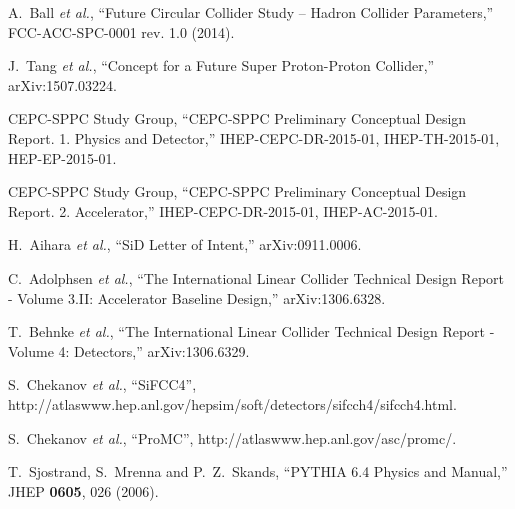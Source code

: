\documentclass{PoS}
\begin{document}
\begin{thebibliography}{99}
 A.~Ball {\it et al.}, 
``Future Circular Collider Study -- Hadron Collider Parameters,'' 
 FCC-ACC-SPC-0001 rev. 1.0 (2014).

  J.~Tang {\it et al.},
  ``Concept for a Future Super Proton-Proton Collider,''
  arXiv:1507.03224.%

  CEPC-SPPC Study Group,
  ``CEPC-SPPC Preliminary Conceptual Design Report. 1. Physics and Detector,''
  IHEP-CEPC-DR-2015-01, IHEP-TH-2015-01, HEP-EP-2015-01.


  CEPC-SPPC Study Group,
  ``CEPC-SPPC Preliminary Conceptual Design Report. 2.  Accelerator,''
  IHEP-CEPC-DR-2015-01, IHEP-AC-2015-01.

  H.~Aihara {\it et al.},
  ``SiD Letter of Intent,''
  arXiv:0911.0006.%

  C.~Adolphsen {\it et al.},
  ``The International Linear Collider Technical Design Report - Volume 3.II: Accelerator Baseline Design,''
  arXiv:1306.6328.%

  T.~Behnke {\it et al.},
  ``The International Linear Collider Technical Design Report - Volume 4: Detectors,''
  arXiv:1306.6329.%

  S.~Chekanov {\it et al.},
 ``SiFCC4'',
  http://atlaswww.hep.anl.gov/hepsim/soft/detectors/sifcch4/sifcch4.html.

  S.~Chekanov {\it et al.},
 ``ProMC'',
  http://atlaswww.hep.anl.gov/asc/promc/.

  T.~Sjostrand, S.~Mrenna and P.~Z.~Skands,
  ``PYTHIA 6.4 Physics and Manual,''
  JHEP {\bf 0605}, 026 (2006).


\end{thebibliography}
\end{document}
